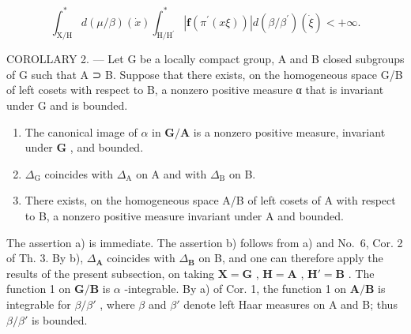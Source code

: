 \[
\int_ {\mathrm{X} / \mathrm{H}} ^ {*} d (\mu / \beta) (\dot {x}) \int_ {\mathrm{H} / \mathrm{H} ^ {\prime}} ^ {*} | \mathbf {f} (\pi^ {\prime} (x \xi)) | d (\beta / \beta^ {\prime}) (\dot {\xi}) <   + \infty .
\]

COROLLARY 2. --- Let G be a locally compact group, A and B closed subgroups of G such that A ⊃ B. Suppose that there exists, on the homogeneous space G/B of left cosets with respect to B, a nonzero positive measure α that is invariant under G and is bounded.

\begin{enumerate}
\def\labelenumi{\alph{enumi})}
\item
  The canonical image of \(\alpha\) in \(\mathbf{G} / \mathbf{A}\) is a nonzero positive measure, invariant under \(\mathbf{G}\) , and bounded.
\item
  \(\Delta_{\mathrm{G}}\) coincides with \(\Delta_{\mathrm{A}}\) on A and with \(\Delta_{\mathrm{B}}\) on B.
\item
  There exists, on the homogeneous space A/B of left cosets of A with respect to B, a nonzero positive measure invariant under A and bounded.
\end{enumerate}

The assertion a) is immediate. The assertion b) follows from a) and No.~6, Cor. 2 of Th. 3. By b), \(\Delta_{\mathbf{A}}\) coincides with \(\Delta_{\mathbf{B}}\) on B, and one can therefore apply the results of the present subsection, on taking \(\mathbf{X} = \mathbf{G}\) , \(\mathbf{H} = \mathbf{A}\) , \(\mathbf{H}' = \mathbf{B}\) . The function 1 on \(\mathbf{G} / \mathbf{B}\) is \(\alpha\) -integrable. By a) of Cor. 1, the function 1 on \(\mathbf{A} / \mathbf{B}\) is integrable for \(\beta / \beta'\) , where \(\beta\) and \(\beta'\) denote left Haar measures on A and B; thus \(\beta / \beta'\) is bounded.

